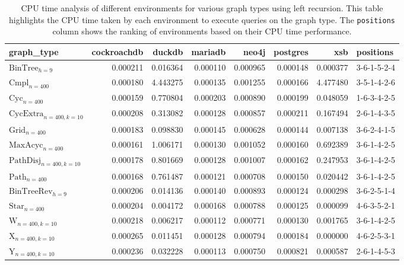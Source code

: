 \begin{table}
\caption{CPU time analysis of different environments for various graph types using left recursion. This table highlights the CPU time taken by each environment to execute queries on the graph type. The \texttt{positions} column shows the ranking of environments based on their CPU time performance.}
\label{table:results}
\begin{tabular}{lrrrrrrl}
\toprule
graph\_type & cockroachdb & duckdb & mariadb & neo4j & postgres & xsb & positions \\
\midrule
$\text{BinTree}_{h=9}$ & 0.000211 & 0.016364 & 0.000110 & 0.000965 & 0.000148 & 0.000377 & 3-6-1-5-2-4 \\
$\text{Cmpl}_{n=400}$ & 0.000180 & 4.443275 & 0.000135 & 0.001255 & 0.000166 & 4.477480 & 3-5-1-4-2-6 \\
$\text{Cyc}_{n=400}$ & 0.000159 & 0.770804 & 0.000203 & 0.000890 & 0.000199 & 0.048059 & 1-6-3-4-2-5 \\
$\text{CycExtra}_{n=400,k=10}$ & 0.000208 & 0.313082 & 0.000128 & 0.000857 & 0.000211 & 0.167494 & 2-6-1-4-3-5 \\
$\text{Grid}_{n=400}$ & 0.000183 & 0.098830 & 0.000145 & 0.000628 & 0.000144 & 0.007138 & 3-6-2-4-1-5 \\
$\text{MaxAcyc}_{n=400}$ & 0.000161 & 1.006171 & 0.000130 & 0.001052 & 0.000160 & 0.692389 & 3-6-1-4-2-5 \\
$\text{PathDisj}_{n=400,k=10}$ & 0.000178 & 0.801669 & 0.000128 & 0.001007 & 0.000162 & 0.247953 & 3-6-1-4-2-5 \\
$\text{Path}_{n=400}$ & 0.000168 & 0.761487 & 0.000121 & 0.000708 & 0.000150 & 0.020442 & 3-6-1-4-2-5 \\
$\text{BinTreeRev}_{h=9}$ & 0.000206 & 0.014136 & 0.000140 & 0.000893 & 0.000124 & 0.000298 & 3-6-2-5-1-4 \\
$\text{Star}_{n=400}$ & 0.000204 & 0.004172 & 0.000168 & 0.000788 & 0.000125 & 0.000099 & 4-6-3-5-2-1 \\
$\text{W}_{n=400,k=10}$ & 0.000218 & 0.006217 & 0.000112 & 0.000771 & 0.000130 & 0.001765 & 3-6-1-4-2-5 \\
$\text{X}_{n=400, k=10}$ & 0.000265 & 0.011451 & 0.000128 & 0.000794 & 0.000184 & 0.000000 & 4-6-2-5-3-1 \\
$\text{Y}_{n=400,k=10}$ & 0.000236 & 0.032228 & 0.000113 & 0.000750 & 0.000821 & 0.000587 & 2-6-1-4-5-3 \\
\bottomrule
\end{tabular}
\end{table}
